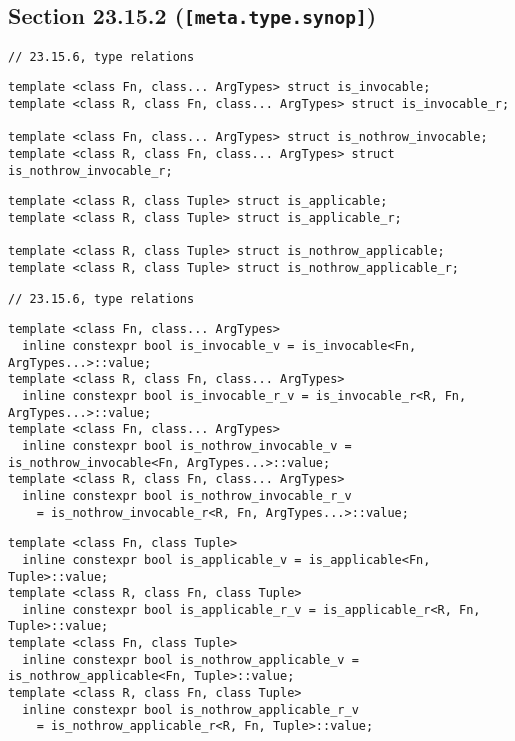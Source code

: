 \documentclass{article}
\begin{document}
\subsection{Section 23.15.2 (\texttt{[meta.type.synop]})}
\begin{lstlisting}
// 23.15.6, type relations
\end{lstlisting}
\begin{lstlisting}
template <class Fn, class... ArgTypes> struct is_invocable;
template <class R, class Fn, class... ArgTypes> struct is_invocable_r;

template <class Fn, class... ArgTypes> struct is_nothrow_invocable;
template <class R, class Fn, class... ArgTypes> struct is_nothrow_invocable_r;
\end{lstlisting}
\begin{lstlisting}[style=base]
template <class R, class Tuple> struct is_applicable;
template <class R, class Tuple> struct is_applicable_r;

template <class R, class Tuple> struct is_nothrow_applicable;
template <class R, class Tuple> struct is_nothrow_applicable_r;
\end{lstlisting}

\begin{lstlisting}
// 23.15.6, type relations
\end{lstlisting}
\begin{lstlisting}
template <class Fn, class... ArgTypes>
  inline constexpr bool is_invocable_v = is_invocable<Fn, ArgTypes...>::value;
template <class R, class Fn, class... ArgTypes>
  inline constexpr bool is_invocable_r_v = is_invocable_r<R, Fn, ArgTypes...>::value;
template <class Fn, class... ArgTypes>
  inline constexpr bool is_nothrow_invocable_v = is_nothrow_invocable<Fn, ArgTypes...>::value;
template <class R, class Fn, class... ArgTypes>
  inline constexpr bool is_nothrow_invocable_r_v
    = is_nothrow_invocable_r<R, Fn, ArgTypes...>::value;
\end{lstlisting}
\begin{lstlisting}[style=base]
template <class Fn, class Tuple>
  inline constexpr bool is_applicable_v = is_applicable<Fn, Tuple>::value;
template <class R, class Fn, class Tuple>
  inline constexpr bool is_applicable_r_v = is_applicable_r<R, Fn, Tuple>::value;
template <class Fn, class Tuple>
  inline constexpr bool is_nothrow_applicable_v = is_nothrow_applicable<Fn, Tuple>::value;
template <class R, class Fn, class Tuple>
  inline constexpr bool is_nothrow_applicable_r_v
    = is_nothrow_applicable_r<R, Fn, Tuple>::value;
\end{lstlisting}
\end{document}
